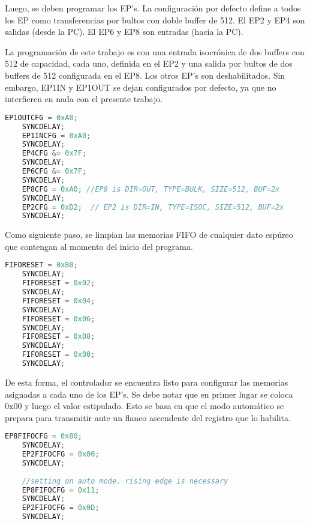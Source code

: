 	Luego, se deben programar los EP's. La configuración por defecto define a todos los EP como transferencias por bultos con doble buffer de \SI{512}{\byte}. El EP2 y EP4 son salidas (desde la PC). El EP6 y EP8 son entradas (hacia la PC).%
	
	La programación de este trabajo es con una entrada isocrónica de dos buffers con \SI{512}{\byte} de capacidad, cada uno, definida en el EP2 y una salida por bultos de dos buffers de \SI{512}{\byte} configurada en el EP8. Los otros EP's son deshabilitados. Sin embargo, EP1IN y EP1OUT se dejan configurados por defecto, ya que no interfieren en nada con el presente trabajo.
	
%	
	\begin{lstlisting}[language=C,backgroundcolor=\color{gray!30}]
	EP1OUTCFG = 0xA0;
	SYNCDELAY;
	EP1INCFG = 0xA0;
	SYNCDELAY;
	EP4CFG &= 0x7F;
	SYNCDELAY;
	EP6CFG &= 0x7F;
	SYNCDELAY;
	EP8CFG = 0xA0; //EP8 is DIR=OUT, TYPE=BULK, SIZE=512, BUF=2x
	SYNCDELAY;
	EP2CFG = 0xD2;  // EP2 is DIR=IN, TYPE=ISOC, SIZE=512, BUF=2x
	SYNCDELAY;
	\end{lstlisting}
	
	Como siguiente paso, se limpian las memorias FIFO de cualquier dato espúreo que contengan al momento del inicio del programa.
	
	\begin{lstlisting}[language=C,backgroundcolor=\color{gray!30}]
	FIFORESET = 0x80;
	SYNCDELAY;
	FIFORESET = 0x02;
	SYNCDELAY;
	FIFORESET = 0x04;
	SYNCDELAY;
	FIFORESET = 0x06;
	SYNCDELAY;
	FIFORESET = 0x08;
	SYNCDELAY;
	FIFORESET = 0x00;
	SYNCDELAY;
	\end{lstlisting}
	
	De esta forma, el controlador se encuentra listo para configurar las memorias asignadas a cada uno de los EP's. Se debe notar que en primer lugar se coloca 0x00 y luego el valor estipulado. Esto se basa en que el modo automático se prepara para transmitir ante un flanco ascendente del registro que lo habilita.
	
%	
	\begin{lstlisting}[language=C,backgroundcolor=\color{gray!30}]
	EP8FIFOCFG = 0x00;
	SYNCDELAY;
	EP2FIFOCFG = 0x00;
	SYNCDELAY;
	
	//setting on auto mode. rising edge is necessary
	EP8FIFOCFG = 0x11;
	SYNCDELAY;
	EP2FIFOCFG = 0x0D;
	SYNCDELAY;
	\end{lstlisting}

